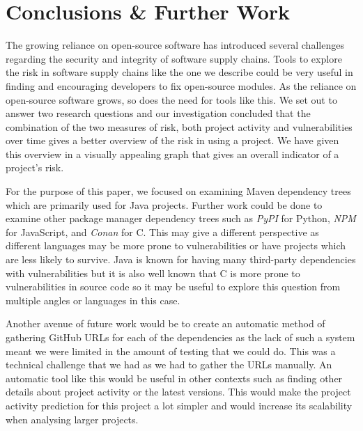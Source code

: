 \documentclass[conference]{IEEEtran}
\begin{document}
\section{Conclusions \& Further Work}
The growing reliance on open-source software has introduced several challenges regarding the security and integrity of software supply chains. Tools to explore the risk in software supply chains like the one we describe could be very useful in finding and encouraging developers to fix open-source modules. As the reliance on open-source software grows, so does the need for tools like this. We set out to answer two research questions and our investigation concluded that the combination of the two measures of risk, both project activity and vulnerabilities over time gives a better overview of the risk in using a project. We have given this overview in a visually appealing graph that gives an overall indicator of a project's risk. 

For the purpose of this paper, we focused on examining Maven dependency trees which are primarily used for Java projects. Further work could be done to examine other package manager dependency trees such as \textit{PyPI} for Python, \textit{NPM} for JavaScript, and \textit{Conan} for C. This may give a different perspective as different languages may be more prone to vulnerabilities or have projects which are less likely to survive. Java is known for having many third-party dependencies with vulnerabilities but it is also well known that C is more prone to vulnerabilities in source code so it may be useful to explore this question from multiple angles or languages in this case. 

Another avenue of future work would be to create an automatic method of gathering GitHub URLs for each of the dependencies as the lack of such a system meant we were limited in the amount of testing that we could do. This was a technical challenge that we had as we had to gather the URLs manually. An automatic tool like this would be useful in other contexts such as finding other details about project activity or the latest versions. This would make the project activity prediction for this project a lot simpler and would increase its scalability when analysing larger projects. 
\end{document}
